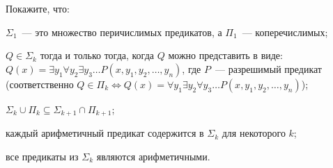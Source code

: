 Покажите, что:
\begin{enumcyr}
    \item $\Sigma_1$~--- это множество перичислимых предикатов, а $\Pi_1$~--- коперечислимых;
    \item $Q \in \Sigma_k$ тогда и только тогда, когда $Q$ можно представить в виде: $Q(x) = \exists y_1
        \forall y_2 \exists y_3 \dots P(x, y_1, y_2, \dots, y_n)$, где $P$~--- разрешимый предикат
        (соответственно $Q \in \Pi_k \Leftrightarrow Q(x) = \forall y_1 \exists y_2 \forall y_3 \dots
        P(x, y_1, y_2, \dots, y_n)$);
    \item $\Sigma_k \cup \Pi_k \subseteq \Sigma_{k + 1} \cap \Pi_{k + 1}$;
    \item каждый арифметичный предикат содержится в $\Sigma_k$ для некоторого $k$;
    \item все предикаты из $\Sigma_k$ являются арифметичными.
\end{enumcyr}
